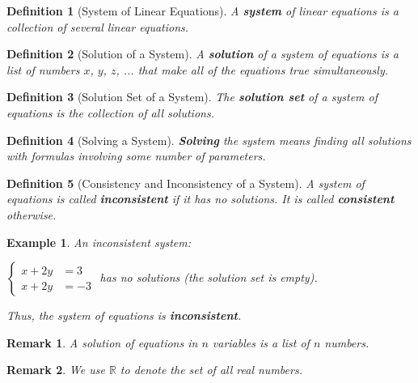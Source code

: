 \documentclass[12pt, a4paper]{article}
\newtheorem{df}{Definition}[subsection]
\newtheorem{eg}{Example}[subsection]
\newtheorem*{rmk}{\indent Remark}
\def\R{{\mathbb{R}}}
\begin{document}
\begin{df}[System of Linear Equations]
A \textbf{system} of linear equations is a collection of several linear equations.
\end{df}

\begin{df}[Solution of a System]
A \textbf{solution} of a system of equations is a list of numbers $x$, $y$, $z$, ... that make all of the equations true simultaneously.
\end{df}

\begin{df}[Solution Set of a System]
The \textbf{solution set} of a system of equations is the collection of all solutions.
\end{df}

\begin{df}[Solving a System]
\textbf{Solving} the system means finding all solutions with formulas involving some number of parameters.
\end{df}

\begin{df}[Consistency and Inconsistency of a System]
A system of equations is called \textbf{inconsistent} if it has no solutions. It is called \textbf{consistent} otherwise. 
\end{df}

\begin{eg}
An inconsistent system: \par

\begin{center} $\left\{\begin{aligned}x+2y&=3\\x+2y&=-3\end{aligned}\right.$ has no solutions (the solution set is \textit{empty}).
\end{center}
Thus, the system of equations is \textbf{inconsistent}.
\end{eg}

\begin{rmk}
A solution of equations in $n$ variables is a list of $n$ numbers.
\end{rmk}

\begin{rmk}
We use $\R$ to denote the set of all real numbers.
\end{rmk}
\end{document}
